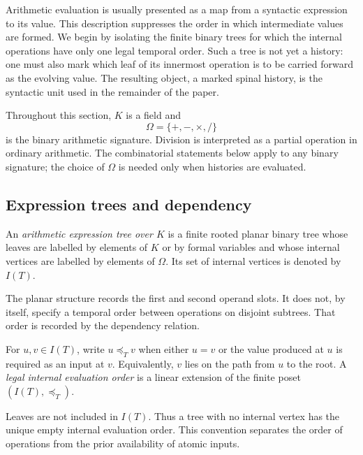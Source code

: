 Arithmetic evaluation is usually presented as a map from a syntactic expression
to its value.  This description suppresses the order in which intermediate
values are formed.  We begin by isolating the finite binary trees for which the
internal operations have only one legal temporal order.  Such a tree is not yet
a history: one must also mark which leaf of its innermost operation is to be
carried forward as the evolving value.  The resulting object, a marked spinal
history, is the syntactic unit used in the remainder of the paper.

Throughout this section, $K$ is a field and
\[
  \Omega=\{+,-,\times,/\}
\]
is the binary arithmetic signature.  Division is interpreted as a partial
operation in ordinary arithmetic.  The combinatorial statements below apply
to any binary signature; the choice of $\Omega$ is needed only when histories
are evaluated.

\subsection{Expression trees and dependency}

\begin{definition}
\label{def:arithmetic-expression-tree}
An \emph{arithmetic expression tree over $K$} is a finite rooted planar binary
tree whose leaves are labelled by elements of $K$ or by formal variables and
whose internal vertices are labelled by elements of $\Omega$.  Its set of
internal vertices is denoted by $I(T)$.
\end{definition}

The planar structure records the first and second operand slots.  It does not,
by itself, specify a temporal order between operations on disjoint subtrees.
That order is recorded by the dependency relation.

\begin{definition}
\label{def:internal-dependency-poset}
For $u,v\in I(T)$, write $u\preccurlyeq_T v$ when either $u=v$ or the value
produced at $u$ is required as an input at $v$.  Equivalently, $v$ lies on the
path from $u$ to the root.  A \emph{legal internal evaluation order} is a
linear extension of the finite poset $(I(T),\preccurlyeq_T)$.
\end{definition}

Leaves are not included in $I(T)$.  Thus a tree with no internal vertex has the
unique empty internal evaluation order.  This convention separates the order
of operations from the prior availability of atomic inputs.


